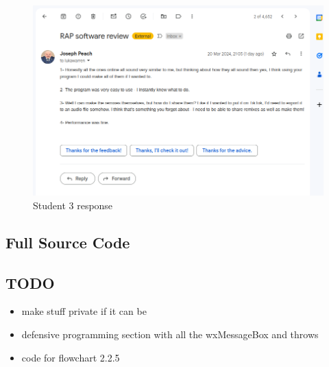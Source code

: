 \documentclass{article}
\begin{document}
	\begin{figure}[H]
		\includegraphics[width=14cm]{./joseph evaluation.png}
		\caption{Student 3 response}
	\end{figure}
	
	\pagebreak
	\subsection{Full Source Code}
	
	
	\subsection{TODO}
	\begin{itemize}
		\item make stuff private if it can be
		\item defensive programming section with all the wxMessageBox and throws
		\item code for flowchart 2.2.5
	\end{itemize}
\end{document}
